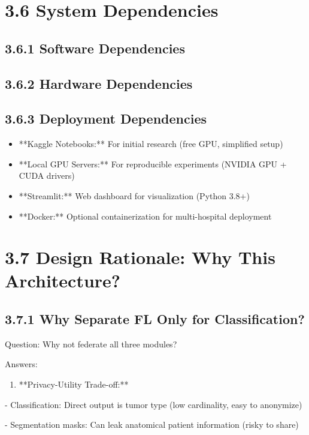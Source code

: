 \section{3.6 System Dependencies}

\subsection{3.6.1 Software Dependencies}

\subsection{3.6.2 Hardware Dependencies}

\subsection{3.6.3 Deployment Dependencies}
\begin{itemize}
  \item **Kaggle Notebooks:** For initial research (free GPU, simplified setup)
  \item **Local GPU Servers:** For reproducible experiments (NVIDIA GPU + CUDA drivers)
  \item **Streamlit:** Web dashboard for visualization (Python 3.8+)
  \item **Docker:** Optional containerization for multi-hospital deployment
\end{itemize}


\section{3.7 Design Rationale: Why This Architecture?}

\subsection{3.7.1 Why Separate FL Only for Classification?}
Question: Why not federate all three modules?

Answers:

\begin{enumerate}
  \item **Privacy-Utility Trade-off:**
\end{enumerate}

- Classification: Direct output is tumor type (low cardinality, easy to anonymize)

- Segmentation masks: Can leak anatomical patient information (risky to share)

